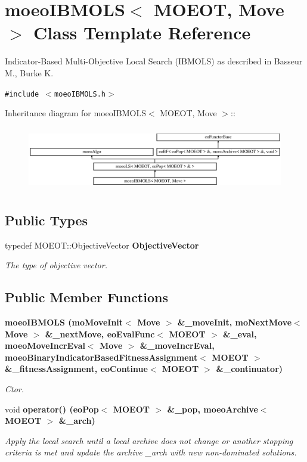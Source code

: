 \section{moeo\-IBMOLS$<$ MOEOT, Move $>$ Class Template Reference}
\label{classmoeoIBMOLS}
Indicator-Based Multi-Objective Local Search (IBMOLS) as described in Basseur M., Burke K.  


{\tt \#include $<$moeo\-IBMOLS.h$>$}

Inheritance diagram for moeo\-IBMOLS$<$ MOEOT, Move $>$::\begin{figure}[H]
\begin{center}
\leavevmode
\includegraphics[height=2.83544cm]{classmoeoIBMOLS}
\end{center}
\end{figure}
\subsection*{Public Types}
\begin{CompactItemize}
\item 
typedef MOEOT::Objective\-Vector \bf{Objective\-Vector}\label{classmoeoIBMOLS_d3433001dcc9a6e2a967aa5d64163935}

\begin{CompactList}\small\item\em The type of objective vector. \item\end{CompactList}\end{CompactItemize}
\subsection*{Public Member Functions}
\begin{CompactItemize}
\item 
\bf{moeo\-IBMOLS} (mo\-Move\-Init$<$ Move $>$ \&\_\-move\-Init, mo\-Next\-Move$<$ Move $>$ \&\_\-next\-Move, \bf{eo\-Eval\-Func}$<$ MOEOT $>$ \&\_\-eval, \bf{moeo\-Move\-Incr\-Eval}$<$ Move $>$ \&\_\-move\-Incr\-Eval, \bf{moeo\-Binary\-Indicator\-Based\-Fitness\-Assignment}$<$ MOEOT $>$ \&\_\-fitness\-Assignment, \bf{eo\-Continue}$<$ MOEOT $>$ \&\_\-continuator)
\begin{CompactList}\small\item\em Ctor. \item\end{CompactList}\item 
void \bf{operator()} (\bf{eo\-Pop}$<$ MOEOT $>$ \&\_\-pop, \bf{moeo\-Archive}$<$ MOEOT $>$ \&\_\-arch)
\begin{CompactList}\small\item\em Apply the local search until a local archive does not change or another stopping criteria is met and update the archive \_\-arch with new non-dominated solutions. \item\end{CompactList}\end{CompactItemize}
